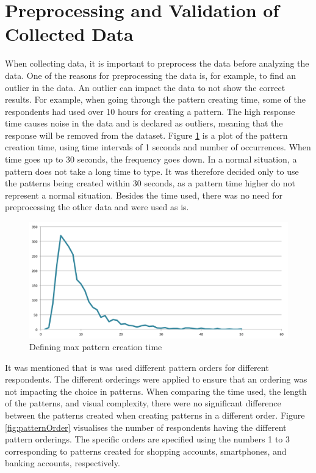 \section{Preprocessing and Validation of Collected Data} \label{sec:preprocessvalidate}
  When collecting data, it is important to preprocess the data before analyzing the data. One of the reasons for preprocessing the data is, for example, to find an outlier in the data. An outlier can impact the data to not show the correct results. For example, when going through the pattern creating time, some of the respondents had used over 10 hours for creating a pattern. The high response time causes noise in the data and is declared as outliers, meaning that the response will be removed from the dataset. Figure \ref{fig:patterncreationtimeoutliner} is a plot of the pattern creation time, using time intervals of 1 seconds and number of occurrences. When time goes up to 30 seconds, the frequency goes down. In a normal situation, a pattern does not take a long time to type. It was therefore decided only to use the patterns being created within 30 seconds, as a pattern time higher do not represent a normal situation. Besides the time used, there was no need for preprocessing the other data and were used as is.  
  
    \begin{figure}[H]
      \centering
      \includegraphics[width=\textwidth]{pics/analysis/limittimeframe.png}
      \caption{Defining max pattern creation time}
      \label{fig:patterncreationtimeoutliner}
    \end{figure}

  It was mentioned that is was used different pattern orders for different respondents. The different orderings were applied to ensure that an ordering was not impacting the choice in patterns. When comparing the time used, the length of the patterns, and visual complexity, there were no significant difference between the patterns created when creating patterns in a different order. Figure \ref{fig:patternOrder} visualises the number of respondents having the different pattern orderings. The specific orders are specified using the numbers 1 to 3 corresponding to patterns created for shopping accounts, smartphones, and banking accounts, respectively. 

